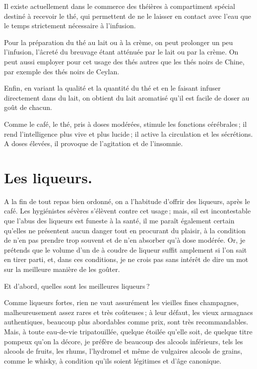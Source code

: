 \sk

Il existe actuellement dans le commerce des théières à compartiment spécial
destiné à recevoir le thé, qui permettent de ne le laisser en contact avec
l'eau que le temps strictement nécessaire à l'infusion.

\sk

Pour la préparation du thé au lait ou à la crème, on peut prolonger un peu
l'infusion, l'âcreté du breuvage étant atténuée par le lait ou par la crème. On
peut aussi employer pour cet usage des thés autres que les thés noirs de Chine,
par exemple des thés noirs de Ceylan.

\sk

Enfin, en variant la qualité et la quantité du thé et en le faisant infuser
directement dans du lait, on obtient du lait aromatisé qu'il est facile de
doser au goût de chacun.

\sk

Comme le café, le thé, pris à doses modérées, stimule les fonctions
cérébrales ; il rend l'intelligence plus vive et plus lucide ; il active la
circulation et les sécrétions. A doses élevées, il provoque de l'agitation et
de l'insomnie.

\section*{\centering Les liqueurs.}
{}

A la fin de tout repas bien ordonné, on a l'habitude d'offrir des liqueurs,
après le café. Les hygiénistes sévères s'élèvent contre cet usage ; mais, sil
est incontestable que l'abus des liqueurs est funeste à la santé, il me paraît
également certain qu'elles ne présentent aucun danger tout en procurant du
plaisir, à la condition de n'en pas prendre trop souvent et de n'en absorber
qu'à dose modérée. Or, je prétends que le volume d'un de à coudre de liqueur
suffit amplement si l'on sait en tirer parti, et, dans ces conditions, je ne
crois pas sans intérêt de dire un mot sur la meilleure manière de les goûter.

Et d'abord, quelles sont les meilleures liqueurs ?

Comme liqueurs fortes, rien ne vaut assurément les vieilles fines champagnes,
malheureusement assez rares et très coûteuses ; à leur défaut, les vieux
armagnacs authentiques, beaucoup plus abordables comme prix, sont très
recommandables. Mais, à toute eau-de-vie tripatouillée, quelque étoilée qu'elle
soit, de quelque titre pompeux qu'on la décore, je préfère de beaucoup des
alcools inférieurs, tels les alcools de fruits, les rhums, l'hydromel et même
de vulgaires alcools de grains, comme le whisky, à condition qu'ils soient
légitimes et d'âge canonique.

